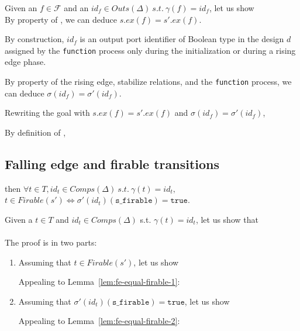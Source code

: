\documentclass[dvipsnames,12pt]{article}
\begin{document}
\begin{niproof}
  Given an $f\in\mathcal{F}$ and an
  $id_f\in{}Outs(\Delta)~s.t.~\gamma(f)=id_f$, let us show
  \\

  \noindent{}By property of \dwSitpn, we can deduce
  $s.ex(f)=s'.ex(f)$.
  
  \noindent{}By construction, $id_f$ is an output port identifier of
  Boolean type in the \hvhdl{} design $d$ assigned by the
  \texttt{function} process only during the initialization or during a
  rising edge phase.

  \noindent{}By property of the \hvhdl{} rising edge, stabilize
  relations, and the \texttt{function} process, we can deduce
  $\sigma(id_f)=\sigma'(id_f)$.

  \noindent{}Rewriting the goal with $s.ex(f)=s'.ex(f)$ and
  $\sigma(id_f)=\sigma'(id_f)$, 

  \noindent{}By definition of \upSim, 
\end{niproof}

\subsection{Falling edge and firable transitions}
\label{sec:fe-firable}


\begin{lemma}
  \label{lem:fe-equal-firable}
  \fehyps{} then
  $\forall{}t\in{}T,id_t\in{}Comps(\Delta)~s.t.~\gamma(t)=id_t,$
  $t\in{}Firable(s')\Leftrightarrow\sigma'(id_t)(\texttt{s\_firable})=\mathtt{true}$.
\end{lemma}

\begin{niproof}
  Given a $t\in{}T$ and $id_t\in{}Comps(\Delta)$
  s.t. $\gamma(t)=id_t$, let us show that\\
  \\

  The proof is in two parts:
  \begin{enumerate}
  \item Assuming that $t\in{}Firable(s')$, let us show
    
    Appealing to Lemma~\ref{lem:fe-equal-firable-1}:
    
  \item Assuming that $\sigma'(id_t)(\texttt{s\_firable})=\mathtt{true}$, let
    us show 
    
    Appealing to Lemma~\ref{lem:fe-equal-firable-2}:
  \end{enumerate}
  
\end{niproof}
\end{document}
